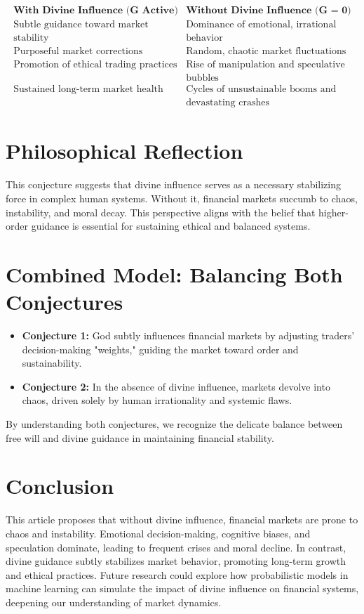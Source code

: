 \documentclass[a4]{article}
\begin{document}
$$
\begin{array}{ll}
\textbf{With Divine Influence (G Active)} & \textbf{Without Divine Influence (G = 0)} \\
\text{Subtle guidance toward market} & \text{Dominance of emotional, irrational} \\
\text{stability} & \text{behavior} \\
\text{Purposeful market corrections} & \text{Random, chaotic market fluctuations} \\
\text{Promotion of ethical trading practices} & \text{Rise of manipulation and speculative} \\
&  \text{bubbles} \\
\text{Sustained long-term market health} & \text{Cycles of unsustainable booms and}\\
& \text{devastating crashes}
\end{array}
$$

\section{Philosophical Reflection}

This conjecture suggests that divine influence serves as a necessary stabilizing force in complex human systems. Without it, financial markets succumb to chaos, instability, and moral decay. This perspective aligns with the belief that higher-order guidance is essential for sustaining ethical and balanced systems.



\section{Combined Model: Balancing Both Conjectures}

\begin{itemize}
\item  {\bf Conjecture 1:}  God subtly influences financial markets by adjusting traders' decision-making "weights," guiding the market toward order and sustainability.
\item  {\bf Conjecture 2:}  In the absence of divine influence, markets devolve into chaos, driven solely by human irrationality and systemic flaws.
\end{itemize}

By understanding both conjectures, we recognize the delicate balance between free will and divine guidance in maintaining financial stability.

\section{Conclusion}

This article proposes that without divine influence, financial markets are prone to chaos and instability. Emotional decision-making, cognitive biases, and speculation dominate, leading to frequent crises and moral decline. In contrast, divine guidance subtly stabilizes market behavior, promoting long-term growth and ethical practices. Future research could explore how probabilistic models in machine learning can simulate the impact of divine influence on financial systems, deepening our understanding of market dynamics.
\end{document}
